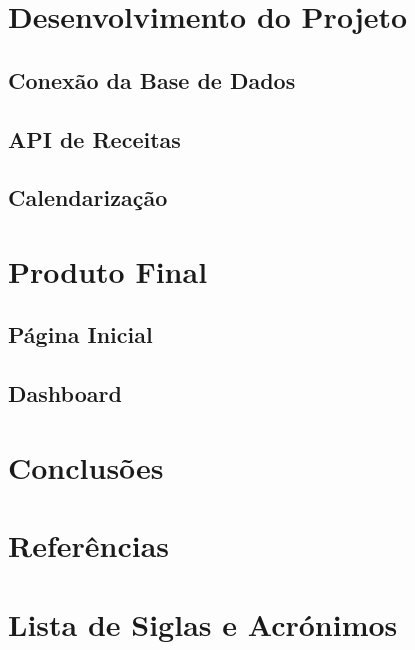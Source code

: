 \documentclass[a4paper]{report}
\begin{document}
\chapter{Desenvolvimento do Projeto}
    \section{Conexão da Base de Dados}
    \section{API de Receitas}
    \section{Calendarização}

\chapter{Produto Final}
    \section{Página Inicial}
    \section{Dashboard}

\chapter{Conclusões}

\chapter{Referências}

\chapter{Lista de Siglas e Acrónimos}
\end{document}

